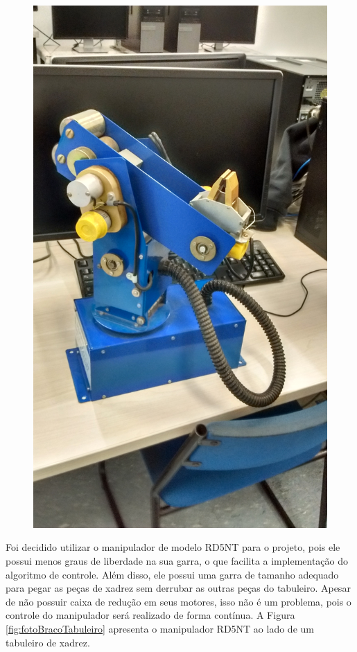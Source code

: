 \begin{figure}[H]
\begin{minipage}{.5\textwidth}
        \includegraphics[keepaspectratio=true, width=0.9\linewidth]
            {img/foto-manipulador-RD5NT.jpg}
        \label{fig:fotoManipuladorRD5NT}
    \end{minipage}%
\end{figure}

Foi decidido utilizar o manipulador de modelo RD5NT para o projeto, pois ele possui menos graus de liberdade na sua garra, o que facilita a implementação do algoritmo de controle.
Além disso, ele possui uma garra de tamanho adequado para pegar as peças de xadrez sem derrubar as outras peças do tabuleiro.
Apesar de não possuir caixa de redução em seus motores, isso não é um problema, pois o controle do manipulador será realizado de forma contínua.
A Figura \ref{fig:fotoBracoTabuleiro} apresenta o manipulador RD5NT ao lado de um tabuleiro de xadrez.


